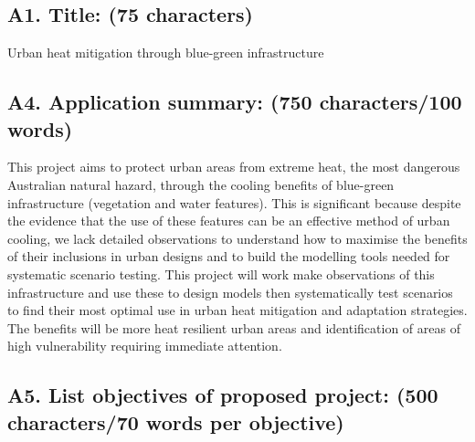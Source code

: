 \subsection*{\TitleFont A1. Title: (75 characters) }


Urban heat mitigation through blue-green infrastructure



\subsection*{\TitleFont A4. Application summary: (750 characters/100 words) }






This project aims to protect urban areas from extreme heat, the most dangerous Australian natural hazard, through the cooling benefits of blue-green infrastructure (vegetation and water features). This is significant because despite the evidence that the use of these features can be an effective method of urban cooling, we lack detailed observations to understand how to maximise the benefits of their inclusions in urban designs and to build the modelling tools needed for systematic scenario testing. This project will work make observations of this infrastructure and use these to design models then systematically test scenarios to find their most optimal use in urban heat mitigation and adaptation strategies. The benefits will be more heat resilient urban areas and identification of areas of high vulnerability requiring immediate attention.




\subsection*{\TitleFont A5. List objectives of proposed project: (500 characters/70 words per objective) }





